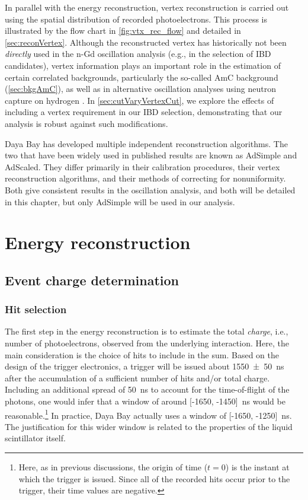 \documentclass[../thesis.tex]{subfiles}
\begin{document}
In parallel with the energy reconstruction, vertex reconstruction is carried out using the spatial distribution of recorded photoelectrons. This process is illustrated by the flow chart in \autoref{fig:vtx_rec_flow} and detailed in \autoref{sec:reconVertex}. Although the reconstructed vertex has historically not been \emph{directly} used in the n-Gd oscillation analysis (e.g., in the selection of IBD candidates), vertex information plays an important role in the estimation of certain correlated backgrounds, particularly the so-called AmC background (\autoref{sec:bkgAmC}), as well as in alternative oscillation analyses using neutron capture on hydrogen \cite{new_nH_paper}. In \autoref{sec:cutVaryVertexCut}, we explore the effects of including a vertex requirement in our IBD selection, demonstrating that our analysis is robust against such modifications.

Daya Bay has developed multiple independent reconstruction algorithms. The two that have been widely used in published results are known as AdSimple and AdScaled. They differ primarily in their calibration procedures, their vertex reconstruction algorithms, and their methods of correcting for nonuniformity. Both give consistent results in the oscillation analysis, and both will be detailed in this chapter, but only AdSimple will be used in our analysis.

\section{Energy reconstruction}
\label{sec:reconEnergy}

\subsection{Event charge determination}
\label{sec:reconEnergyCharge}

\subsubsection{Hit selection}
\label{sec:reconHitSelection}

The first step in the energy reconstruction is to estimate the total \emph{charge}, i.e., number of photoelectrons, observed from the underlying interaction. Here, the main consideration is the choice of hits to include in the sum. Based on the design of the trigger electronics, a trigger will be issued about \SI{1550 \pm 50}{ns} after the accumulation of a sufficient number of hits and/or total charge. Including an additional spread of 50~ns to account for the time-of-flight of the photons, one would infer that a window of around [-1650, -1450]~ns would be reasonable.\footnote{Here, as in previous discussions, the origin of time ($t = 0$) is the instant at which the trigger is issued. Since all of the recorded hits occur prior to the trigger, their time values are negative.} In practice, Daya Bay actually uses a window of [-1650, -1250]~ns. The justification for this wider window is related to the properties of the liquid scintillator itself.
\end{document}
